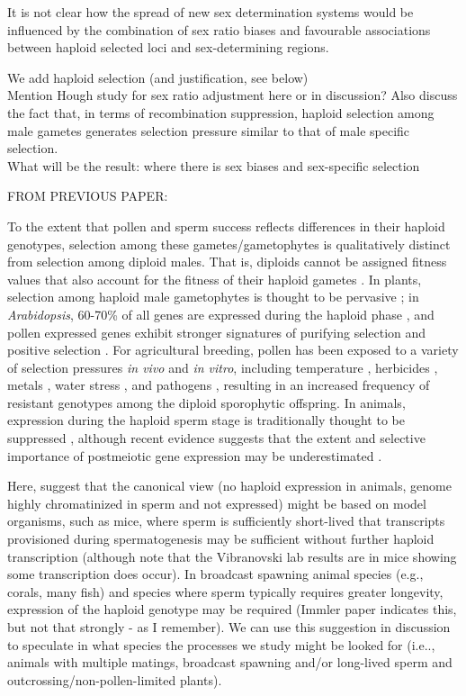 \documentclass[12pt]{article}
\begin{document}
It is not clear how the spread of new sex determination systems would be influenced by the combination of sex ratio biases and favourable associations between haploid selected loci and sex-determining regions. 



We add haploid selection (and justification, see below)
\\
Mention Hough study for sex ratio adjustment here or in discussion? Also discuss the fact that, in terms of recombination suppression, haploid selection among male gametes generates selection pressure similar to that of male specific selection. 
\\
What will be the result: where there is sex biases and sex-specific selection




{\color{blue}
FROM PREVIOUS PAPER:

To the extent that pollen and sperm success reflects differences in their haploid genotypes, selection among these gametes/gametophytes is qualitatively distinct from selection among diploid males. 
That is, diploids cannot be assigned fitness values that also account for the fitness of their haploid gametes \cite{Immler:2012tl}. 
In plants, selection among haploid male gametophytes is thought to be pervasive \cite{SKOGSMYR:2002ce,Moore:2011jt,Marshall:2016fe}; in \textit{Arabidopsis}, 60-70\% of all genes are expressed during the haploid phase \cite{Borg:2009jpa}, and pollen expressed genes exhibit stronger signatures of purifying selection and positive selection \cite{Arunkumar:2013iq,Gossmann:2014dua}.
For agricultural breeding, pollen has been exposed to a variety of selection pressures \textit{in vivo} and \textit{in vitro}, including temperature \cite{Hedhly:2004iv,Clarke:2004ir}, herbicides \cite{Frascaroli:2001ee}, metals \cite{Searcy:1985vt}, water stress \cite{Ravikumar:2003uo}, and pathogens \cite{Ravikumar:2012ej}, resulting in an increased frequency of resistant genotypes among the diploid sporophytic offspring. 
In animals, expression during the haploid sperm stage is traditionally thought to be suppressed \cite{Hecht:1998hz}, although recent evidence suggests that the extent and selective importance of postmeiotic gene expression may be underestimated \cite{Zheng:2001fi,JOSEPH:2004haa,Vibranovski:2010et,Immler:2014im}. 
}

Here, suggest that the canonical view (no haploid expression in animals, genome highly chromatinized in sperm and not expressed) might be based on model organisms, such as mice, where sperm is sufficiently short-lived that transcripts provisioned during spermatogenesis may be sufficient without further haploid transcription (although note that the Vibranovski lab results are in mice showing some transcription does occur). 
In broadcast spawning animal species (e.g., corals, many fish) and species where sperm typically requires greater longevity, expression of the haploid genotype may be required (Immler paper indicates this, but not that strongly - as I remember). 
We can use this suggestion in discussion to speculate in what species the processes we study might be looked for (i.e.., animals with multiple matings, broadcast spawning and/or long-lived sperm and outcrossing/non-pollen-limited plants). 
\end{document}
